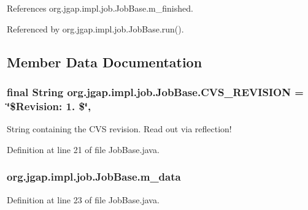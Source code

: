 References org.\-jgap.\-impl.\-job.\-Job\-Base.\-m\-\_\-finished.



Referenced by org.\-jgap.\-impl.\-job.\-Job\-Base.\-run().



\subsection{Member Data Documentation}
\hypertarget{classorg_1_1jgap_1_1impl_1_1job_1_1_job_base_a19fbc5c8d459b8f481c74e9b43d1d678}{
\subsubsection[{C\-V\-S\-\_\-\-R\-E\-V\-I\-S\-I\-O\-N}]{\setlength{\rightskip}{0pt plus 5cm}final String org.\-jgap.\-impl.\-job.\-Job\-Base.\-C\-V\-S\-\_\-\-R\-E\-V\-I\-S\-I\-O\-N = \char`\"{}\$Revision\-: 1. \$\char`\"{}\hspace{0.3cm}{\ttfamily [static]}, {\ttfamily [private]}}}\label{classorg_1_1jgap_1_1impl_1_1job_1_1_job_base_a19fbc5c8d459b8f481c74e9b43d1d678}
String containing the C\-V\-S revision. Read out via reflection! 

Definition at line 21 of file Job\-Base.\-java.

\hypertarget{classorg_1_1jgap_1_1impl_1_1job_1_1_job_base_ac567f0af79ce7d13ea205374aa641a79}{
\subsubsection[{m\-\_\-data}]{ org.\-jgap.\-impl.\-job.\-Job\-Base.\-m\-\_\-data\hspace{0.3cm}{\ttfamily [private]}}}\label{classorg_1_1jgap_1_1impl_1_1job_1_1_job_base_ac567f0af79ce7d13ea205374aa641a79}


Definition at line 23 of file Job\-Base.\-java.



